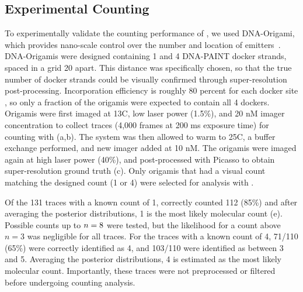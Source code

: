 \subsection{Experimental Counting}
To experimentally validate the counting performance of \ours, we used DNA-Origami, 
which provides nano-scale control over the number and location of emitters~\citep{rothemund_folding_2006}.
	DNA-Origamis were designed containing 1 and 4 DNA-PAINT docker strands, 
	spaced in a grid 20 \nanometer apart. 
	This distance was specifically chosen, so that the true number of docker strands 
	could be visually confirmed through super-resolution post-processing.
	Incorporation efficiency is roughly 80 percent for each docker site \cite{strauss_2018}, 
	so only a fraction of the origamis were expected to contain all 4 dockers. 
	Origamis were first imaged at 13\textdegree C, low laser power (1.5\%), and 20 nM imager concentration to 
	collect traces (4,000 frames at 200 ms exposure time) for counting with \ours (a,b).
	The system was then allowed to warm to 25\textdegree C, a buffer exchange performed, and new imager 
	added at 10 nM.
	The origamis were imaged again at high laser power (40\%),
	and post-processed with Picasso \citep{schnitzbauer_2017} to obtain super-resolution ground truth (c).
	Only origamis that had a visual count matching the designed count (1 or 4) were selected for analysis with \ours.

Of the 131 traces with a known count of 1, \ours correctly counted 112 (85\%)
and after averaging the posterior distributions, 1 is the most likely molecular count (e).
	Possible counts up to $n=8$ were tested, but the likelihood for a count above $n=3$ was negligible for all traces.
	For the traces with a known count of 4, 71/110 (65\%) were correctly identified as 4, 
	and 103/110 were identified as between 3 and 5. 
	Averaging the posterior distributions, 4 is estimated as the most likely molecular count. 
	Importantly, these traces were not preprocessed or filtered before undergoing \ours counting analysis.
